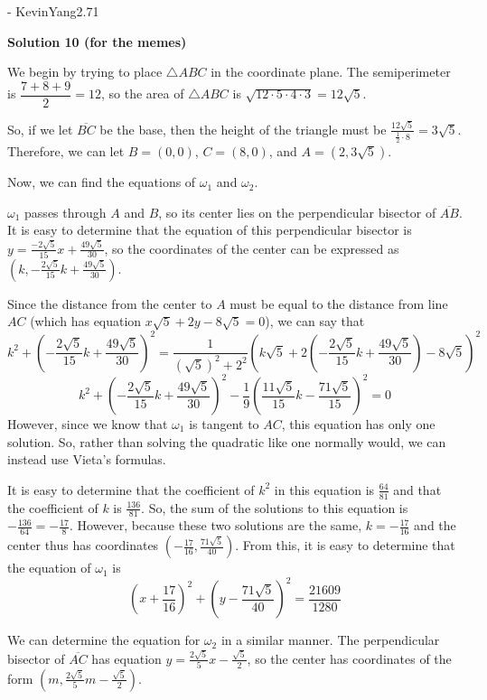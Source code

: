 \begin{enumerate}
 - KevinYang2.71

 



\textbf{Solution 10 (for the memes)}

We begin by trying to place $\triangle ABC$ in the coordinate plane. The semiperimeter is $\dfrac{7+8+9}{2}=12$, so the area of $\triangle ABC$ is $\sqrt{12 \cdot 5 \cdot 4 \cdot 3}=12\sqrt{5}$. 

 So, if we let $\overline{BC}$ be the base, then the height of the triangle must be $\frac{12 \sqrt 5}{\frac{1}{2} \cdot 8}=3 \sqrt{5}$. Therefore, we can let $B=(0,0)$, $C=(8,0)$, and $A=(2, 3\sqrt5)$.

 Now, we can find the equations of $\omega_1$ and $\omega_2$. 

 $\omega_1$ passes through $A$ and $B$, so its center lies on the perpendicular bisector of $\overline{AB}$. It is easy to determine that the equation of this perpendicular bisector is $y=\frac{-2\sqrt5}{15}x+\frac{49\sqrt5}{30}$, so the coordinates of the center can be expressed as $\left(k, -\frac{2\sqrt5}{15}k+\frac{49\sqrt5}{30} \right)$.

 Since the distance from the center to $A$ must be equal to the distance from line $AC$ (which has equation $x\sqrt{5}+2y-8\sqrt{5}=0$), we can say that
 \[k^2+\left(-\frac{2\sqrt5}{15} k+\frac{49\sqrt5}{30} \right)^2=\frac{1}{(\sqrt{5})^2+2^2} \left(k\sqrt{5}+2 \left(-\frac{2\sqrt5}{15}k+\frac{49\sqrt5}{30} \right)-8\sqrt5 \right)^2\] 
 \[k^2+\left(-\frac{2\sqrt{5}}{15}k+\frac{49\sqrt5}{30} \right)^2-\frac{1}{9} \left(\frac{11\sqrt5}{15}k-\frac{71\sqrt5}{15} \right)^2=0\]However, since we know that $\omega_1$ is tangent to $AC$, this equation has only one solution. So, rather than solving the quadratic like one normally would, we can instead use Vieta's formulas.

 It is easy to determine that the coefficient of $k^2$ in this equation is $\frac{64}{81}$ and that the coefficient of $k$ is $\frac{136}{81}$. So, the sum of the solutions to this equation is $-\frac{136}{64}=-\frac{17}{8}$. However, because these two solutions are the same, $k=-\frac{17}{16}$ and the center thus has coordinates $\left(-\frac{17}{16}, \frac{71\sqrt5}{40} \right)$. From this, it is easy to determine that the equation of $\omega_1$ is 
 \[\left(x+\frac{17}{16} \right)^2+\left(y-\frac{71\sqrt{5}}{40} \right)^2=\frac{21609}{1280}\]

 We can determine the equation for $\omega_2$ in a similar manner. The perpendicular bisector of $\overline{AC}$ has equation $y=\frac{2\sqrt5}{5}x-\frac{\sqrt 5}{2}$, so the center has coordinates of the form $\left(m, \frac{2\sqrt5}{5}m-\frac{\sqrt5}{2} \right)$.


\end{enumerate}
